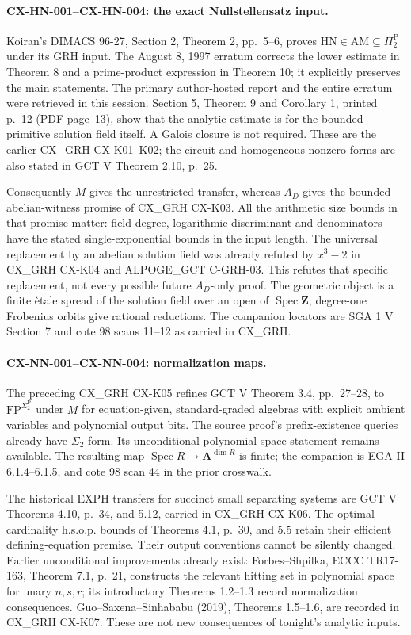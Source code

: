 \documentclass[11pt,a4paper]{article}
\begin{document}
\paragraph{CX-HN-001--CX-HN-004: the exact Nullstellensatz input.}
Koiran's DIMACS 96-27, Section 2, Theorem 2, pp.~5--6, proves
$\mathrm{HN}\in\mathrm{AM}\subseteq\Pi_2^{\mathrm P}$ under its GRH input.
The August 8, 1997 erratum corrects the lower estimate in Theorem 8 and a
prime-product expression in Theorem 10; it explicitly preserves the main
statements. The primary author-hosted report and the entire erratum were
retrieved in this session. Section 5, Theorem 9 and Corollary 1, printed p.~12 (PDF page~13),
show that the analytic estimate is for the bounded primitive solution
field itself. A Galois closure is not required. These are the earlier
CX\_GRH CX-K01--K02; the circuit and homogeneous nonzero forms are also
stated in GCT V Theorem 2.10, p.~25.

Consequently $M$ gives the unrestricted transfer, whereas $A_D$ gives the
bounded abelian-witness promise of CX\_GRH CX-K03. All the arithmetic size
bounds in that promise matter: field degree, logarithmic discriminant and
denominators have the stated single-exponential bounds in the input length.
The universal replacement by an abelian solution field was already refuted
by $x^3-2$ in CX\_GRH CX-K04 and ALPOGE\_GCT C-GRH-03. This refutes that
specific replacement, not every possible future $A_D$-only proof.
The geometric object is a finite \`etale spread of the solution field over
an open of $\operatorname{Spec}\mathbf Z$; degree-one Frobenius orbits give
rational reductions. The companion locators are SGA 1 V Section 7 and
cote 98 scans 11--12 as carried in CX\_GRH.

\paragraph{CX-NN-001--CX-NN-004: normalization maps.}
The preceding CX\_GRH CX-K05 refines GCT V Theorem 3.4, pp.~27--28, to
$\mathrm{FP}^{\Sigma_2^{\mathrm P}}$ under $M$ for equation-given,
standard-graded algebras with explicit ambient variables and polynomial
output bits. The source proof's prefix-existence queries already have
$\Sigma_2$ form. Its unconditional polynomial-space statement remains
available. The resulting map
$\operatorname{Spec}R\to\mathbf A^{\dim R}$ is finite; the companion is
EGA II 6.1.4--6.1.5, and cote 98 scan 44 in the prior crosswalk.

The historical EXPH transfers for succinct small separating systems are
GCT V Theorems 4.10, p.~34, and 5.12, carried in CX\_GRH CX-K06. The
optimal-cardinality h.s.o.p. bounds of Theorems 4.1, p.~30, and 5.5 retain
their efficient defining-equation premise. Their output conventions cannot
be silently changed. Earlier unconditional improvements already exist:
Forbes--Shpilka, ECCC TR17-163, Theorem 7.1, p.~21, constructs the relevant
hitting set in polynomial space for unary $n,s,r$; its introductory
Theorems 1.2--1.3 record normalization consequences. Guo--Saxena--Sinhababu
(2019), Theorems 1.5--1.6, are recorded in CX\_GRH CX-K07. These are not
new consequences of tonight's analytic inputs.
\end{document}
